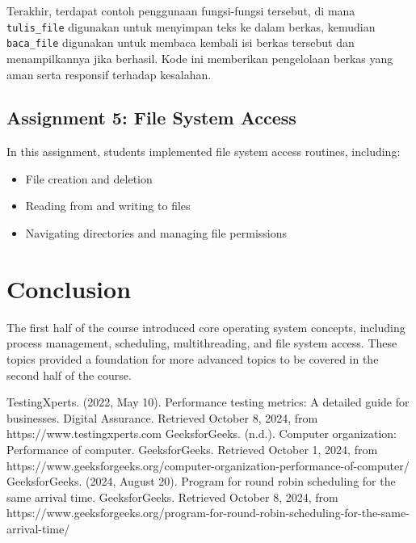 \documentclass[12pt]{article}
\begin{document}
Terakhir, terdapat contoh penggunaan fungsi-fungsi tersebut, di mana \texttt{tulis\_file} digunakan untuk menyimpan teks ke dalam berkas, kemudian \texttt{baca\_file} digunakan untuk membaca kembali isi berkas tersebut dan menampilkannya jika berhasil. Kode ini memberikan pengelolaan berkas yang aman serta responsif terhadap kesalahan.


\subsection{Assignment 5: File System Access}
In this assignment, students implemented file system access routines, including:
\begin{itemize}
    \item File creation and deletion
    \item Reading from and writing to files
    \item Navigating directories and managing file permissions
\end{itemize}

\section{Conclusion}
The first half of the course introduced core operating system concepts, including process management, scheduling, multithreading, and file system access. These topics provided a foundation for more advanced topics to be covered in the second half of the course.

\begin{thebibliography}{9}
    TestingXperts. (2022, May 10). Performance testing metrics: A detailed guide for businesses. Digital Assurance. Retrieved October 8, 2024, from https://www.testingxperts.com
    GeeksforGeeks. (n.d.). Computer organization: Performance of computer. GeeksforGeeks. Retrieved October 1, 2024, from https://www.geeksforgeeks.org/computer-organization-performance-of-computer/
    GeeksforGeeks. (2024, August 20). Program for round robin scheduling for the same arrival time. GeeksforGeeks. Retrieved October 8, 2024, from https://www.geeksforgeeks.org/program-for-round-robin-scheduling-for-the-same-arrival-time/
\end{thebibliography}
\end{document}
